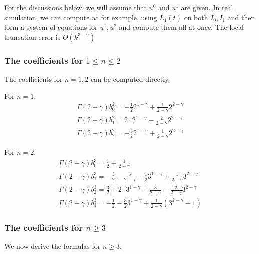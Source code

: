 \documentclass[11pt]{article}
\begin{document}
For the discussions below, we will assume that $u^0$ and $u^1$ are given. In real simulation, we can compute $u^1$ for example, using $L_1(t)$ on both $I_0, I_1$ and then form a system of equations for $u^1, u^2$ and compute them all at once. The local truncation error is $O(k^{3-\gamma})$

\subsubsection{The coefficients for $1\le n\le 2$}
The coefficients for $n=1, 2$ can be computed directly.

For $n=1$,
\begin{gather*}
\Gamma(2-\gamma)b_{0}^{2}=-\frac{1}{2}2^{1-\gamma}+\frac{1}{2-\gamma}2^{2-\gamma}\\
\Gamma(2-\gamma)b_{1}^{2}=2\cdot 2^{1-\gamma}-\frac{2}{2-\gamma}2^{2-\gamma}\\
\Gamma(2-\gamma)b_{2}^{2}=-\frac{3}{2}2^{1-\gamma}+\frac{1}{2-\gamma}2^{2-\gamma}
\end{gather*}

For $n=2$,
\begin{gather*}
\Gamma(2-\gamma)b_{0}^{3}=\frac{1}{2}+\frac{1}{2-\gamma}\\
\Gamma(2-\gamma)b_{1}^{3}
=-\frac{3}{2}-\frac{3}{2-\gamma}-\frac{1}{2}3^{1-\gamma}
+\frac{1}{2-\gamma}3^{2-\gamma}\\
\Gamma(2-\gamma)b_{2}^{3}=\frac{3}{2}+2\cdot 3^{1-\gamma}
+\frac{3}{2-\gamma}-\frac{2}{2-\gamma}3^{2-\gamma}\\
\Gamma(2-\gamma)b_{3}^{3}=-\frac{1}{2}
-\frac{3}{2}3^{1-\gamma}+\frac{1}{2-\gamma}(3^{2-\gamma}-1)
\end{gather*}

\subsubsection{The coefficients for $n\ge 3$}
We now derive the formulas for $n\ge 3$.
\end{document}
